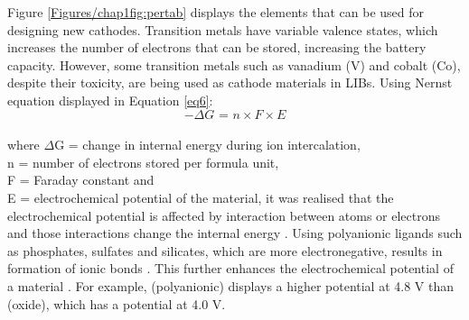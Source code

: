 Figure \ref{Figures/chap1fig:pertab} displays the elements that can be used for designing new cathodes. Transition metals have variable valence states, which increases the number of electrons that can be stored, increasing the battery capacity. However, some transition metals such as vanadium (V) and cobalt (Co), despite their toxicity, are being used as cathode materials in LIBs.
Using Nernst equation displayed in Equation \ref{eq6}:
\begin{equation} \label{eq6}
    -\Delta G \text{ = } n \times F \times E
\end{equation}\\
where $\Delta$G = change in internal energy during ion intercalation,\\
n = number of electrons stored per formula unit,\\
F = Faraday constant and\\
E = electrochemical potential of the material, it was realised that the electrochemical potential is affected by interaction between atoms or electrons and those interactions change the internal energy \cite{liu_understanding_2016}. Using polyanionic ligands such as phosphates, sulfates and silicates, which are more electronegative, results in formation of ionic bonds \cite{liu_understanding_2016}. This further enhances the electrochemical potential of a material \cite{melot_design_2013}. For example,  (polyanionic) displays a higher potential at 4.8 V than  (oxide), which has a potential at 4.0 V\cite{masquelier_polyanionic_2013}. 

